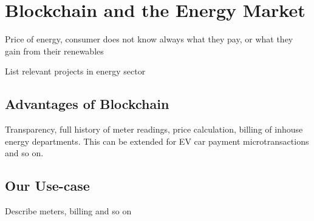 \chapter{Blockchain and the Energy Market}
Price of energy, consumer does not know always what they pay, or what they gain from their renewables

List relevant projects in energy sector


\section{Advantages of Blockchain}
Transparency, full history of meter readings, price calculation, billing of inhouse energy departments. This can be extended for EV car payment microtransactions and so on.


\section{Our Use-case}
Describe meters, billing and so on